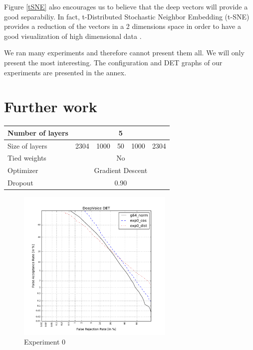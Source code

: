 \documentclass[conference]{IEEEtran}
\begin{document}
Figure \ref{tSNE} also encourages us to believe that the deep vectors will provide a good separabiliy. In fact, t-Distributed Stochastic Neighbor Embedding (t-SNE) provides a reduction of the vectors in a 2 dimensions space in order to have a good visualization of high dimensional data \cite{ictdbid:2777}.

We ran many experiments and therefore cannot present them all. We will only present the most interesting. The configuration and DET graphs of our experiments are presented in the annex.

\section{Further work}


\newpage
\printbibliography

\newpage

\appendix

\begin{table}[!h]
\centering
\begin{tabular}{|l|c|c|c|c|c|}
\hline
Number of layers & \multicolumn{5}{c|}{5}                \\ \hline
Size of layers   & 2304   & 1000   & 50  & 1000  & 2304  \\ \hline
Tied weights     & \multicolumn{5}{c|}{No}               \\ \hline
Optimizer        & \multicolumn{5}{c|}{Gradient Descent} \\ \hline
Dropout          & \multicolumn{5}{c|}{0.90} \\ \hline
\end{tabular}
\end{table}

\begin{figure}[!h]
    \centering
    \includegraphics[width=7.5cm]{../scores/det0.pdf}
    \captionsetup{labelformat=empty}
    \caption{Experiment 0}
\end{figure}
\end{document}
